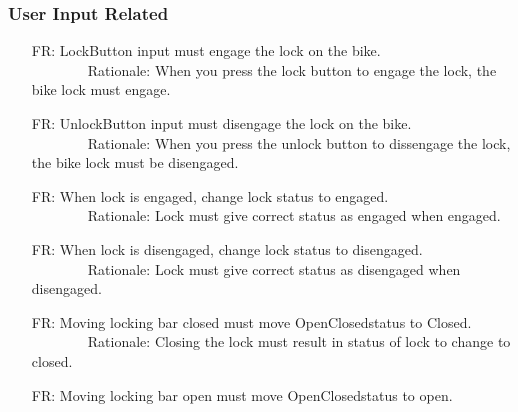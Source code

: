 \documentclass[12pt]{article}
\newcounter{reqnum} %
\begin{document}
\subsubsection{User Input Related}
\begin{itemize}
\setlength{\itemindent}{.5in}
\item[FR\refstepcounter{reqnum}\thereqnum\label{FR1}:] LockButton input must engage the lock on the bike.
\\ \-\ \-\ \-\ \-\ \-\ \-\ \-\ \-\ Rationale: When you press the lock button to engage the lock, the bike lock must engage.
\item[FR\refstepcounter{reqnum}\thereqnum\label{FR2}:] UnlockButton input must disengage the lock on the bike.
\\ \-\ \-\ \-\ \-\ \-\ \-\ \-\ \-\ Rationale: When you press the unlock button to dissengage the lock, the bike lock must be disengaged.
\item[FR\refstepcounter{reqnum}\thereqnum\label{FR3}:] When lock is engaged, change lock status to engaged.
\\ \-\ \-\ \-\ \-\ \-\ \-\ \-\ \-\ Rationale: Lock must give correct status as engaged when engaged.
\item[FR\refstepcounter{reqnum}\thereqnum\label{FR4}:] When lock is disengaged, change lock status to disengaged.
\\ \-\ \-\ \-\ \-\ \-\ \-\ \-\ \-\ Rationale: Lock must give correct status as disengaged when disengaged.
\item[FR\refstepcounter{reqnum}\thereqnum\label{FR5}:] Moving locking bar closed must move OpenClosedstatus to Closed.
\\ \-\ \-\ \-\ \-\ \-\ \-\ \-\ \-\ Rationale: Closing the lock must result in status of lock to change to closed.
\item[FR\refstepcounter{reqnum}\thereqnum\label{FR6}:] Moving locking bar open must move OpenClosedstatus to open.


\end{itemize}
\end{document}
